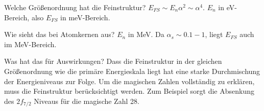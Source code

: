 

\begin{fquestion}{Welche Größenordnung hat die Feinstruktur?}
    $E_{FS} \sim E_n \alpha^2 \sim \alpha^4$.
    $E_n$ in eV-Bereich, also $E_{FS}$ in meV-Bereich.
\end{fquestion}

\begin{fquestion}{Wie sieht das bei Atomkernen aus?}
    $E_n$ in MeV.
    Da $\alpha_s \sim 0.1-1$, liegt $E_{FS}$ auch im MeV-Bereich.
\end{fquestion}

\begin{fquestion}{Was hat das für Auswirkungen?}
    Dass die Feinstruktur in der gleichen Größenordnung wie die primäre Energieskala liegt hat eine starke Durchmischung der Energieniveaus zur Folge. 
    Um die magischen Zahlen vollständig zu erklären, muss die Feinstruktur berücksichtigt werden. 
    Zum Beispiel sorgt die Absenkung des $2f_{7/2}$ Niveaus für die magische Zahl 28. 
\end{fquestion}


    

